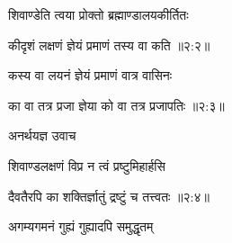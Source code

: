 {\devanagarifont शिवाण्डेति त्वया प्रोक्तो ब्रह्माण्डालयकीर्तितः \thinspace{\dandab} \dontdisplaylinenum }%


{\devanagarifont कीदृशं लक्षणं ज्ञेयं प्रमाणं तस्य वा कति {॥२:२॥} \veg\dontdisplaylinenum }%

{\devanagarifont कस्य वा लयनं ज्ञेयं प्रमाणं वात्र वासिनः \thinspace{\dandab} \dontdisplaylinenum }%


{\devanagarifont का वा तत्र प्रजा ज्ञेया को वा तत्र प्रजापतिः {॥२:३॥} \veg\dontdisplaylinenum }%


 
{\devanagarifont अनर्थयज्ञ उवाच {\dandab}\dontdisplaylinenum  }%
 
{\devanagarifont शिवाण्डलक्षणं विप्र न त्वं प्रष्टुमिहार्हसि \thinspace{\danda} \dontdisplaylinenum }%


{\devanagarifont दैवतैरपि का शक्तिर्ज्ञातुं द्रष्टुं च तत्त्वतः {॥२:४॥} \veg\dontdisplaylinenum }%

{\devanagarifont अगम्यगमनं गुह्यं गुह्यादपि समुद्धृतम् \thinspace{\dandab} \dontdisplaylinenum }%


